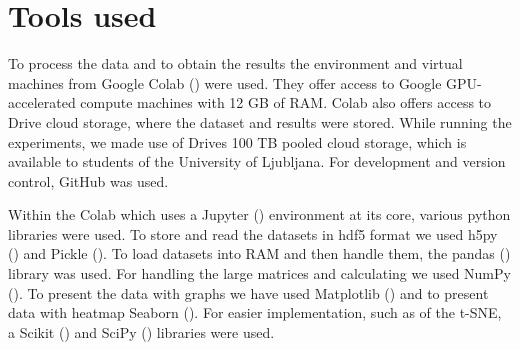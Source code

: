 \section{Tools used}

To process the data and to obtain the results the environment and virtual machines from Google Colab (\cite{colab}) were used.
They offer access to Google GPU-accelerated compute machines with 12 GB of RAM. 
Colab also offers access to Drive cloud storage, where the dataset and results were stored.
While running the experiments, we made use of Drives 100 TB pooled cloud storage, which is available to students of the University of Ljubljana. 
For development and version control, GitHub was used. 

Within the Colab which uses a Jupyter (\cite{jupyter}) environment at its core, various python libraries were used.
To store and read the datasets in hdf5 format we used h5py  (\cite{hdf5}) and Pickle  (\cite{pickle}).
To load datasets into RAM and then handle them, the pandas  (\cite{pandas}) library was used.
For handling the large matrices and calculating we used NumPy  (\cite{numpy}).
To present the data with graphs we have used Matplotlib  (\cite{matplotlib}) and to present data with heatmap Seaborn  (\cite{seaborn}).
For easier implementation, such as of the t-SNE, a Scikit  (\cite{scikit}) and SciPy  (\cite{scipy}) libraries were used.
